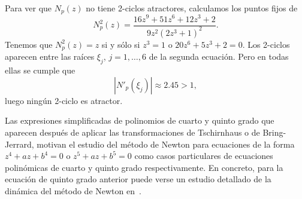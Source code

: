 Para ver que $N_p(z)$ no tiene 2-ciclos atractores, calculamos los puntos fijos de 
$$
N_p^2(z)=\frac{16 z^9+51 z^6+12z^3+2}{9 z^2 \left(2  z^3+1\right)^2}.
$$
Tenemos que $N_p^2(z)=z$ si y sólo si $z^3=1$ o $20 z^6+5 z^3+2=0$. Los 2-ciclos aparecen entre las raíces $\xi_j$, $j=1,\dots, 6$ de la segunda ecuación. Pero en todas ellas se cumple que 
$$
|N'_p(\xi_j)|\approx 2.45>1,
$$
luego ningún 2-ciclo es atractor.

Las expresiones simplificadas de polinomios de cuarto y quinto grado que aparecen después de aplicar las transformaciones de Tschirnhaus o de Bring-Jerrard, motivan el estudio del método de Newton para ecuaciones de la forma $z^4+az+b^4=0$ o $z^5+az+b^5=0$ como casos particulares de ecuaciones polinómicas de cuarto y quinto grado respectivamente. En concreto, para la ecuación de quinto grado anterior puede verse un estudio detallado de la dinámica del método de Newton en~\cite{Balibrea}.










